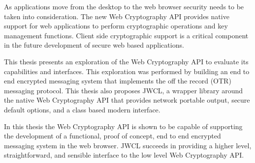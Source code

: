 As applications move from the desktop to the web browser security needs to be taken into consideration. The new Web Cryptography API provides native support for web applications to perform cryptographic operations and key management functions. Client side cryptographic support is a critical component in the future development of secure web based applications.


This thesis presents an exploration of the Web Cryptography API to evaluate its capabilities and interfaces. This exploration was performed by building an end to end encrypted messaging system that implements the off the record (OTR) messaging protocol. This thesis also proposes JWCL, a wrapper library around the native Web Cryptography API that provides network portable output, secure default options, and a class based modern interface. 


In this thesis the Web Cryptography API is shown to be capable of supporting the development of a functional, proof of concept, end to end encrypted messaging system in the web browser. JWCL succeeds in providing a higher level, straightforward, and sensible interface to the low level Web Cryptography API.      

